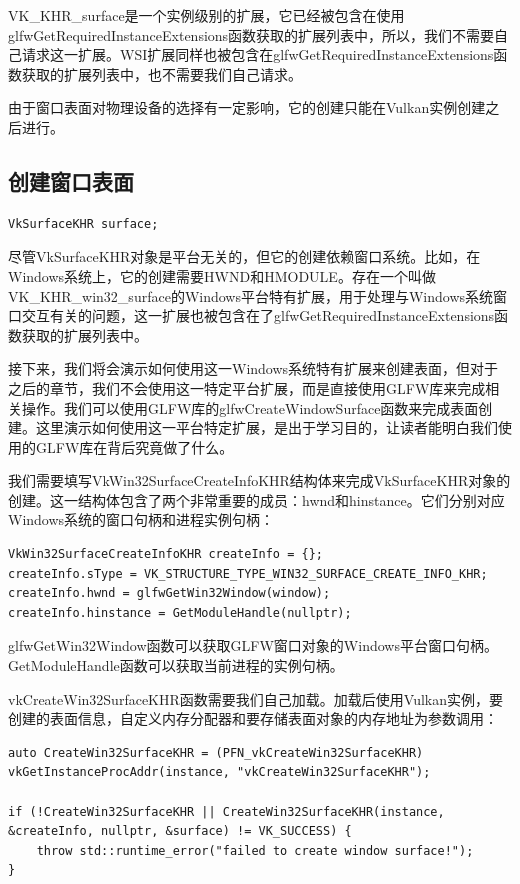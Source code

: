 \documentclass{ctexart}
\begin{document}
VK\_KHR\_surface是一个实例级别的扩展，它已经被包含在使用glfwGetRequiredInstanceExtensions函数获取的扩展列表中，所以，我们不需要自己请求这一扩展。WSI扩展同样也被包含在glfwGetRequiredInstanceExtensions函数获取的扩展列表中，也不需要我们自己请求。

由于窗口表面对物理设备的选择有一定影响，它的创建只能在Vulkan实例创建之后进行。

\subsection{创建窗口表面}

\begin{lstlisting}[language={[ANSI]C}]
VkSurfaceKHR surface;
\end{lstlisting}

尽管VkSurfaceKHR对象是平台无关的，但它的创建依赖窗口系统。比如，在Windows系统上，它的创建需要HWND和HMODULE。存在一个叫做VK\_KHR\_win32\_surface的Windows平台特有扩展，用于处理与Windows系统窗口交互有关的问题，这一扩展也被包含在了glfwGetRequiredInstanceExtensions函数获取的扩展列表中。

接下来，我们将会演示如何使用这一Windows系统特有扩展来创建表面，但对于之后的章节，我们不会使用这一特定平台扩展，而是直接使用GLFW库来完成相关操作。我们可以使用GLFW库的glfwCreateWindowSurface函数来完成表面创建。这里演示如何使用这一平台特定扩展，是出于学习目的，让读者能明白我们使用的GLFW库在背后究竟做了什么。

我们需要填写VkWin32SurfaceCreateInfoKHR结构体来完成VkSurfaceKHR对象的创建。这一结构体包含了两个非常重要的成员：hwnd和hinstance。它们分别对应Windows系统的窗口句柄和进程实例句柄：

\begin{lstlisting}[language={[ANSI]C}]
VkWin32SurfaceCreateInfoKHR createInfo = {};
createInfo.sType = VK_STRUCTURE_TYPE_WIN32_SURFACE_CREATE_INFO_KHR;
createInfo.hwnd = glfwGetWin32Window(window);
createInfo.hinstance = GetModuleHandle(nullptr);
\end{lstlisting}

glfwGetWin32Window函数可以获取GLFW窗口对象的Windows平台窗口句柄。GetModuleHandle函数可以获取当前进程的实例句柄。

vkCreateWin32SurfaceKHR函数需要我们自己加载。加载后使用Vulkan实例，要创建的表面信息，自定义内存分配器和要存储表面对象的内存地址为参数调用：

\begin{lstlisting}[language={[ANSI]C}]
auto CreateWin32SurfaceKHR = (PFN_vkCreateWin32SurfaceKHR) vkGetInstanceProcAddr(instance, "vkCreateWin32SurfaceKHR");

if (!CreateWin32SurfaceKHR || CreateWin32SurfaceKHR(instance, &createInfo, nullptr, &surface) != VK_SUCCESS) {
	throw std::runtime_error("failed to create window surface!");
}
\end{lstlisting}
\end{document}

